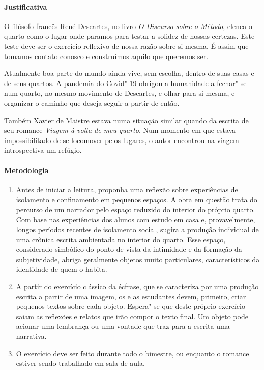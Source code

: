 \documentclass[12pt]{extarticle}
\begin{document}
\paragraph{Justificativa}
O filósofo francês René Descartes, no livro \textit{O Discurso sobre o Método}, 
elenca o quarto como o lugar onde paramos para testar a solidez de nossas certezas. 
Este teste deve ser o exercício reflexivo de nossa razão sobre si mesma. É assim
que tomamos contato conosco e construímos aquilo que queremos ser. 

Atualmente boa parte do mundo ainda vive, sem escolha, dentro de suas
casas e de seus quartos. A pandemia do Covid"-19 obrigou a humanidade
a fechar"-se num quarto, no mesmo movimento de Descartes, e olhar para  
si mesma, e organizar o caminho que deseja seguir a partir de então. 

Também Xavier de Maistre estava numa situação similar quando da 
escrita de seu romance \textit{Viagem à volta de meu quarto}. 
Num momento em que estava impossibilitado de se locomover pelos
lugares, o autor encontrou na viagem introspectiva um refúgio. 

\paragraph{Metodologia}
\begin{enumerate}
	\item
	Antes de iniciar a leitura, proponha uma reflexão sobre
experiências de isolamento e confinamento em pequenos espaços. A obra em
questão trata do percurso de um narrador pelo espaço reduzido do
interior do próprio quarto. Com base nas experiências dos alunos com
estudo em casa e, provavelmente, longos períodos recentes de isolamento
social, sugira a produção individual de uma crônica escrita
ambientada no interior do quarto. Esse espaço, considerado simbólico do
ponto de vista da intimidade e da formação da subjetividade, abriga
geralmente objetos muito particulares, característicos da identidade de
quem o habita.
	\item
	A partir do exercício clássico da écfrase, que se caracteriza por uma
	produção escrita a partir de uma imagem, os e as estudantes devem, primeiro,
	criar pequenos textos sobre cada objeto. Espera"-se que deste próprio
	exercício saiam as reflexões e relatos que irão compor o texto final.
	Um objeto pode acionar uma lembrança ou uma vontade que traz para a escrita
	uma narrativa. 


	\item 
	O exercício deve ser feito durante todo o bimestre, ou enquanto
	o romance estiver sendo trabalhado em sala de aula.

\end{enumerate}
\end{document}
